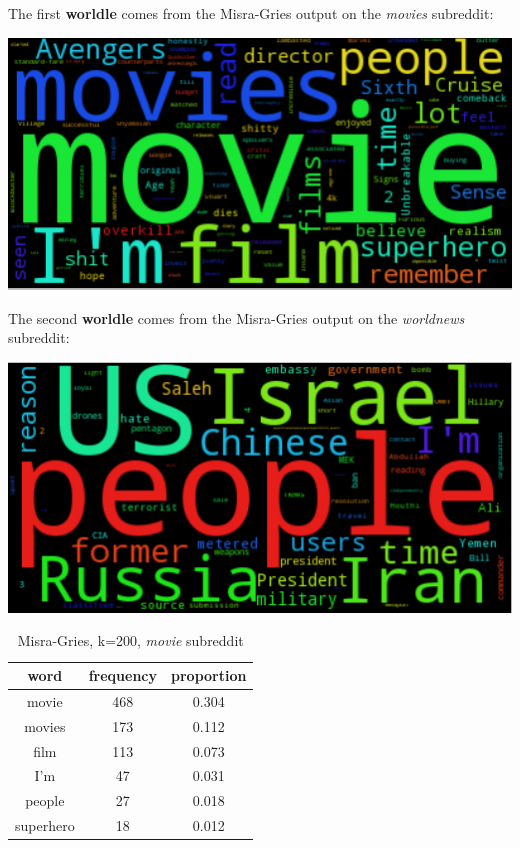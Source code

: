 \documentclass[12pt]{article}
\numberwithin{equation}{section}
\begin{document}
The first \textbf{worldle} comes from the Misra-Gries output on the \textit{movies} subreddit:

\includegraphics[scale=.4]{movies.png}

The second \textbf{worldle} comes from the Misra-Gries output on the \textit{worldnews} subreddit:

\includegraphics[scale=.4]{worldnews.png}


\begin{table}
\centering

\caption{Misra-Gries, k=200, \textit{movie} subreddit}
\begin{tabular}{c|c|c}
\hline
\textbf{word} & \textbf{frequency} & \textbf{proportion}\\
\hline
movie & 468 & 0.304\\
\hline
movies & 173 & 0.112\\
\hline
film & 113 & 0.073\\
\hline
I'm & 47 & 0.031\\
\hline
people & 27 & 0.018\\
\hline
superhero & 18 & 0.012\\
\hline
\end{tabular}
\end{table}
\end{document}
